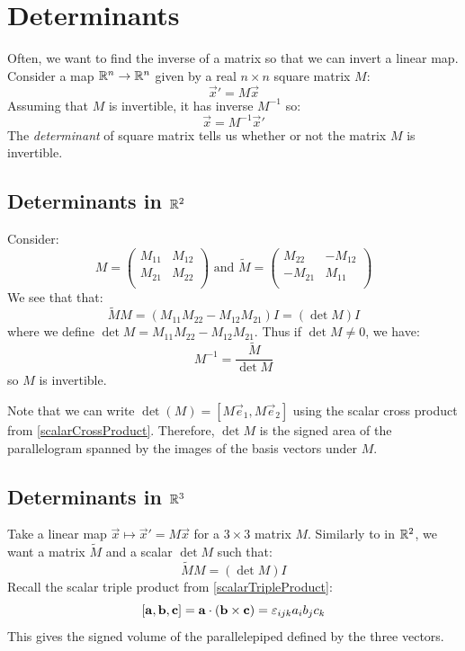 \documentclass[../main.tex]{subfiles}
\begin{document}
\section{Determinants} \label{determinants}
Often, we want to find the inverse of a matrix so that we can invert a linear map.
Consider a map $\mathbb{R}^{n} \to \mathbb{R}^{n}$ given by a real $n \times n$ square matrix $M$:
\[
  \vec{x}' = M\vec{x}
\]
Assuming that $M$ is invertible, it has inverse $M^{-1}$ so:
\[
  \vec{x} = M^{-1}\vec{x}'
\]
The \textit{determinant} of square matrix tells us whether or not the matrix $M$ is invertible.
\subsection{Determinants in \texorpdfstring{$\mathbb{R}^2$}{2D}}
Consider:
\[
  M = \begin{pmatrix}
  M_{1 1} & M_{1 2} \\
  M_{2 1} & M_{2 2} \\
  \end{pmatrix} \text{ and }
  \widetilde{M} = \begin{pmatrix}
  M_{2 2} & -M_{1 2} \\
  -M_{2 1} & M_{1 1} \\
  \end{pmatrix}
\]
We see that that:
\[
  \widetilde{M}M = (M_{1 1}M_{2 2} - M_{1 2}M_{2 1})I = (\det M) I
\]
where we define $\det M = M_{1 1}M_{2 2} - M_{1 2}M_{2 1}$.
Thus if $\det M \neq 0$, we have:
\[
  M^{-1} = \frac{\widetilde{M}}{\det M}
\]
so $M$ is invertible.
\begin{remark}
  Note that we can write $\det(M) = [M\vec{e}_1, M\vec{e}_2]$ using the scalar cross product from \cref{scalarCrossProduct}.
  Therefore, $\det M$ is the signed area of the parallelogram spanned by the images of the basis vectors under $M$.
\end{remark}
\subsection{Determinants in \texorpdfstring{$\mathbb{R}^3$}{3D}}
Take a linear map $\vec{x} \mapsto \vec{x}' = M\vec{x}$ for a $3 \times 3$ matrix $M$.
Similarly to in $\mathbb{R}^2$, we want a matrix $\widetilde{M}$ and a scalar $\det M$ such that:
\[
  \widetilde{M}M = (\det M)I
\]
Recall the scalar triple product from \cref{scalarTripleProduct}:
\[
  [\mathbf{\bm{a}}, \mathbf{\bm{b}}, \mathbf{\bm{c}}] = \mathbf{\bm{a}} \cdot (\mathbf{\bm{b}} \times \mathbf{\bm{c}}) = \varepsilon_{i j k} a_i b_j c_k
\]
This gives the signed volume of the parallelepiped defined by the three vectors.
\end{document}

